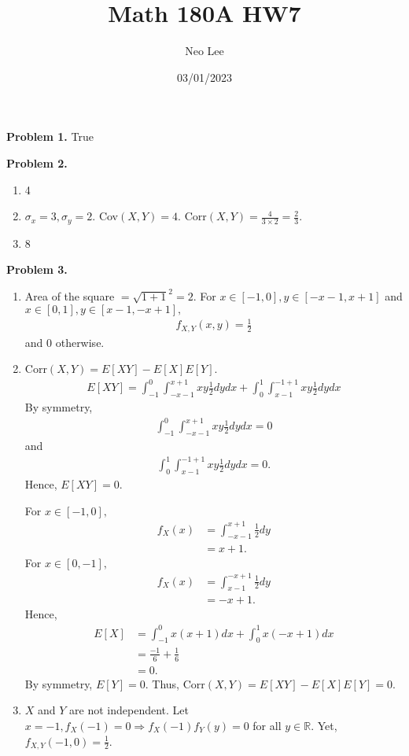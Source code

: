 \documentclass{article}
\title{Math 180A HW7}
\author{Neo Lee}
\date{03/01/2023}
\begin{document}
 

\maketitle 

\textbf{Problem 1.} True
\bigbreak

\textbf{Problem 2.}
\begin{enumerate}[label={(\alph*)}]
    \item 4
    \item $\sigma_x = 3, \sigma_y = 2$. Cov$(X,Y)=4$. Corr$(X,Y)=\frac{4}{3\times 2}=\frac{2}{3}$.
    \item 8
\end{enumerate}
\bigbreak

\textbf{Problem 3.}
\begin{enumerate}[label={(\alph*)}]
    \item 
    Area of the square $=\sqrt{1+1}^2=2.$ For $x\in[-1,0], y\in[-x-1,x+1]$ and $x\in[0,1],y\in[x-1,-x+1],$
    \begin{align}
        f_{X,Y}(x,y)=\frac{1}{2}
    \end{align}
    and 0 otherwise.

    \item 
    Corr$(X,Y)=E[XY]-E[X]E[Y]$.
    \begin{align}
        E[XY]=\int_{-1}^{0}\int_{-x-1}^{x+1}xy\frac{1}{2}dydx + \int_{0}^{1}\int_{x-1}^{-1+1}xy\frac{1}{2}dydx
    \end{align}
    By symmetry, 
    \begin{align}
        \int_{-1}^{0}\int_{-x-1}^{x+1}xy\frac{1}{2}dydx=0
    \end{align}
    and 
    \begin{align}
        \int_{0}^{1}\int_{x-1}^{-1+1}xy\frac{1}{2}dydx=0.
    \end{align}
    Hence, $E[XY]=0.$

    For $x\in[-1,0],$
    \begin{align}
        f_X(x)&=\int_{-x-1}^{x+1}\frac{1}{2}dy \\
        &= x+1.
    \end{align}
    For $x\in[0,-1],$
    \begin{align}
        f_X(x)&=\int_{x-1}^{-x+1}\frac{1}{2}dy \\
        &= -x+1.
    \end{align}
    Hence,
    \begin{align}
        E[X]&=\int_{-1}^{0}x(x+1)dx + \int_{0}^{1}x(-x+1)dx \\
        &=\frac{-1}{6}+\frac{1}{6} \\
        &=0.
    \end{align}
    By symmetry, $E[Y]=0.$ Thus, Corr$(X,Y)=E[XY]-E[X]E[Y]=0.$

    \item 
    $X$ and $Y$ are not independent. Let $x=-1,f_X(-1)=0\Rightarrow f_X(-1)f_Y(y)=0$ for all $y\in\mathbb{R}$. Yet, $f_{X,Y}(-1,0)=\frac{1}{2}$.
\end{enumerate}
\bigbreak
\end{document}
